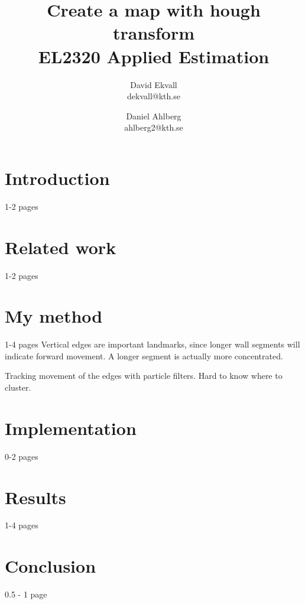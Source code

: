 \documentclass[a4paper,11pt]{article}
\title{
	Create a map with hough transform\\
	EL2320 Applied Estimation
}
\author{
	David Ekvall\\
	dekvall@kth.se\\
	\and
	Daniel Ahlberg\\
	ahlberg2@kth.se\\
}
\begin{document}
\maketitle
{}

\section{Introduction}
1-2 pages

\section{Related work}
1-2 pages \cite{reed2016generative}

\section{My method}
1-4 pages
Vertical edges are important landmarks, since longer wall segments will indicate forward movement. A longer segment is actually more concentrated. 

Tracking movement of the edges with particle filters. Hard to know where to cluster. 

\section{Implementation}
0-2 pages

\section{Results}
1-4 pages

\section{Conclusion}
0.5 - 1 page

\printbibliography
\end{document}

